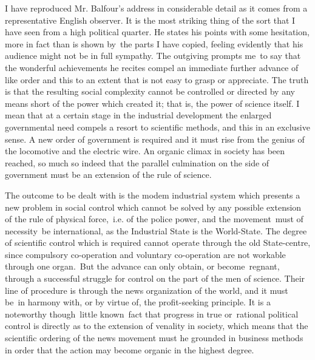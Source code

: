 \documentclass[twoside,symmetric,nobib,justified]{tufte-book}
\begin{document}
I have reproduced Mr. Balfour's address in considerable detail as it
comes from a representative English observer. It is the most striking
thing of the sort that I have seen from a high political quarter. He
states his points with some hesitation, more in fact than is shown
by~the parts I have copied, feeling evidently that his audience might
not be in full sympathy. The outgiving prompts me~to say that the
wonderful achievements he recites compel an immediate further advance of
like order and this to an extent that is not easy to grasp or
appreciate. The truth is that the resulting social complexity cannot be
controlled or directed by any means short of the power which created it;
that is, the power of science itself. I mean that at a certain stage in
the industrial development the enlarged governmental need compels a
resort to scientific methods, and this in an exclusive sense. A new
order of government is required and it must rise from the genius of the
locomotive and the electric wire. An organic climax in society has been
reached, so much so indeed that the parallel culmination on the side of
government must be an extension of the rule of science.~

The outcome to be dealt with is the modem industrial system which
presents a new problem in social control which cannot be solved by any
possible extension of the rule of physical force,~i.e. of the police
power, and the movement~must of necessity~be international, as the
Industrial State is the World-State. The degree of scientific control
which is required cannot operate through the old State-centre, since
compulsory co-operation and voluntary co-operation are not workable
through one organ.~But the advance can only obtain, or become~regnant,
through a successful struggle for control on the part of the men of
science. Their line of procedure is through the news organization of the
world, and it must be~in harmony with, or by virtue of, the
profit-seeking principle. It is a noteworthy though~little known~fact
that progress in true or~rational political control is directly as to
the extension of venality in society, which means that the scientific
ordering of the news movement must he grounded in business methods in
order that the action may become organic in the highest degree.~
\end{document}

